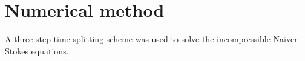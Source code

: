 \section{Numerical method}
A three step time-splitting scheme was used to solve the incompressible Naiver-Stokes equations.